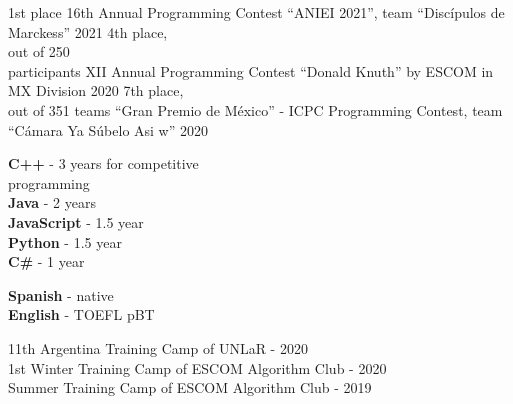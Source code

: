 \documentclass[9pt]{developercv} %
\begin{document}


\begin{entrylist}
	\entry
		{1st place}
		{16th Annual Programming Contest ``ANIEI 2021'', team ``Discípulos de Marckess''}
		{2021}
		{}
	\entry
		{4th place,\\
		out of 250\\
		participants}
		{XII Annual Programming Contest ``Donald Knuth'' by ESCOM in MX Division}
		{2020}
		{}
	\entry
		{7th place,\\out of 351 teams}
		{``Gran Premio de México'' - ICPC Programming Contest, team ``Cámara Ya Súbelo Asi w''}
		{2020}
		{}
\end{entrylist}


\begin{minipage}[t]{0.25\textwidth}
	\vspace{-\baselineskip} %

	
	\textbf{C++} - 3 years for competitive\\
	programming\\
	\textbf{Java} - 2 years\\
	\textbf{JavaScript} - 1.5 year\\
	\textbf{Python} - 1.5 year\\
\textbf{C\#} - 1 year
\end{minipage}
\hfill
\begin{minipage}[t]{0.17\textwidth}
	\vspace{-\baselineskip} %
	
	
	\textbf{Spanish} - native\\
	\textbf{English} - TOEFL pBT
\end{minipage}
\hfill
\begin{minipage}[t]{0.48\textwidth}
	\vspace{-\baselineskip} %
	
	
	11th Argentina Training Camp of UNLaR - 2020\\
	1st Winter Training Camp of ESCOM Algorithm Club - 2020\\
	Summer Training Camp of ESCOM Algorithm Club - 2019
\end{minipage}

\end{document}
